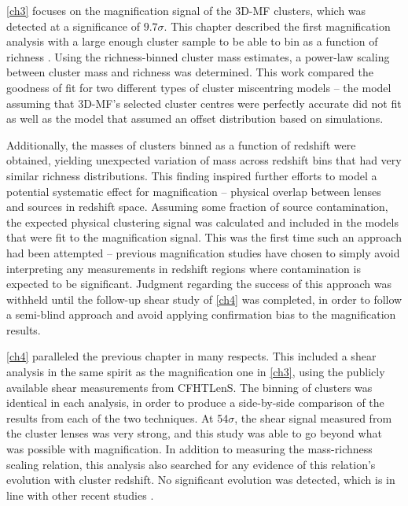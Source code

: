 \autoref{ch3} focuses on the magnification signal of the \ac{3D-MF} clusters, which was detected at a significance of $9.7\sigma$. This chapter described the first magnification analysis with a large enough cluster sample to be able to bin as a function of richness \citep[however, note that the publication of this work was followed in quick succession by a very interesting magnification study of clusters and luminous red galaxies in the \ac{SDSS} by][]{Bauer14}. Using the richness-binned cluster mass estimates, a power-law scaling between cluster mass and richness was determined. This work compared the goodness of fit for two different types of cluster miscentring models -- the model assuming that \ac{3D-MF}'s selected cluster centres were perfectly accurate did not fit as well as the model that assumed an offset distribution based on simulations.

Additionally, the masses of clusters binned as a function of redshift were obtained, yielding unexpected variation of mass across redshift bins that had very similar richness distributions. This finding inspired further efforts to model a potential systematic effect for magnification -- physical overlap between lenses and sources in redshift space. Assuming some fraction of source contamination, the expected physical clustering signal was calculated and included in the models that were fit to the magnification signal. This was the first time such an approach had been attempted -- previous magnification studies have chosen to simply avoid interpreting any measurements in redshift regions where contamination is expected to be significant. Judgment regarding the success of this approach was withheld until the follow-up shear study of \autoref{ch4} was completed, in order to follow a semi-blind approach and avoid applying confirmation bias to the magnification results.

\autoref{ch4} paralleled the previous chapter in many respects. This included a shear analysis in the same spirit as the magnification one in \autoref{ch3}, using the publicly available shear measurements from \ac{CFHTLenS}. The binning of clusters was identical in each analysis, in order to produce a side-by-side comparison of the results from each of the two techniques. At 54$\sigma$, the shear signal measured from the cluster lenses was very strong, and this study was able to go beyond what was possible with magnification. In addition to measuring the mass-richness scaling relation, this analysis also searched for any evidence of this relation's evolution with cluster redshift. No significant evolution was detected, which is in line with other recent studies \citep{Andreon14}. 


